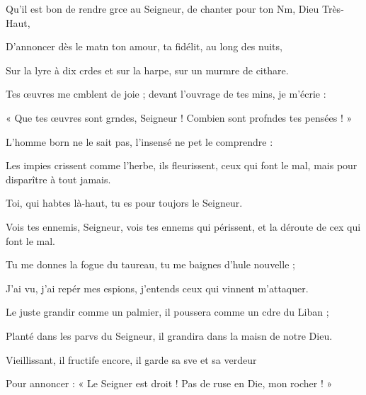 \item Qu’il est bon de rendre grce au Seigneur,\psstar{} de chanter pour ton Nm, Dieu Très-Haut,
\item D’annoncer dès le matn ton amour,\psstar{} ta fidélit, au long des nuits,
\item Sur la lyre à dix crdes et sur la harpe,\psstar{} sur un murmre de cithare.
\item Tes œuvres me cmblent de joie ;\psstar{} devant l’ouvrage de tes mins, je m’écrie :
\item « Que tes œuvres sont grndes, Seigneur !\psstar{} Combien sont profndes tes pensées ! »
\item L’homme born ne le sait pas,\psstar{} l’insensé ne pet le comprendre :
\item Les impies crissent comme l’herbe,\psstar{} ils fleurissent, ceux qui font le mal, mais pour disparître à tout jamais.
\item Toi, qui habtes là-haut,\psstar{} tu es pour toujors le Seigneur.
\item Vois tes ennemis, Seigneur, vois tes ennems qui périssent,\psstar{} et la déroute de cex qui font le mal.
\item Tu me donnes la fogue du taureau,\psstar{} tu me baignes d’hule nouvelle ;
\item J’ai vu, j’ai repér mes espions,\psstar{} j’entends ceux qui vinnent m’attaquer.
\item Le juste grandir comme un palmier,\psstar{} il poussera comme un cdre du Liban ;
\item Planté dans les parvs du Seigneur,\psstar{} il grandira dans la maisn de notre Dieu.
\item Vieillissant, il fructife encore,\psstar{} il garde sa sve et sa verdeur
\item Pour annoncer : « Le Seigner est droit !\psstar{} Pas de ruse en Die, mon rocher ! »